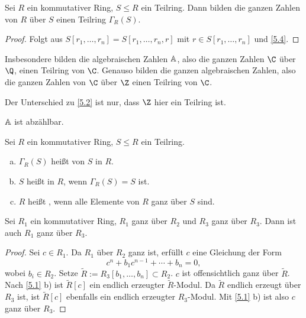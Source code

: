 \begin{kor} \label{5.5}
	Sei $R$ ein kommutativer Ring, $S \le R$ ein Teilring.
	Dann bilden die ganzen Zahlen von $R$ über $S$ einen Teilring $\Gamma_R(S)$.
	\begin{proof}
		Folgt aus $S[r_1, \dotsc, r_n] = S[r_1, \dotsc, r_n, r]$ mit $r \in S[r_1, \dotsc, r_n]$ und \ref{5.4}.
	\end{proof}
	\begin{note}
		Insbesondere bilden die algebraischen Zahlen $\mathbb{A}$, also die ganzen Zahlen $\C$ über $\Q$, einen Teilring von $\C$.
		Genauso bilden die ganzen algebraischen Zahlen, also die ganzen Zahlen von $\C$ über $\Z$ einen Teilring von $\C$.

		Der Unterschied zu \ref{5.2} ist nur, dass $\Z$ hier ein Teilring ist.

		$\mathbb{A}$ ist abzählbar.
	\end{note}
\end{kor}


\begin{df} \label{5.6}
	Sei $R$ ein kommutativer Ring, $S \le R$ ein Teilring.
	\begin{enumerate}[a)]
		\item
			$\Gamma_R(S)$ heißt  von $S$ in $R$.
		\item
			$S$ heißt  in $R$, wenn $\Gamma_R(S) = S$ ist.
		\item
			$R$ heißt , wenn alle Elemente von $R$ ganz über $S$ sind.
	\end{enumerate}
\end{df}

\begin{nt}
	Sei $R_1$ ein kommutativer Ring, $R_1$ ganz über $R_2$ und $R_3$ ganz über $R_3$.
	Dann ist auch $R_1$ ganz über $R_3$.
	\begin{proof}
		Sei $c \in R_1$.
		Da $R_1$ über $R_2$ ganz ist, erfüllt $c$ eine Gleichung der Form
		\[
			c^n + b_1 c^{n-1} + \dotsb + b_n = 0,
		\]
		wobei $b_i \in R_2$.
		Setze $\tilde R := R_3[b_1, \dotsc, b_n] \subset R_2$.
		$c$ ist offensichtlich ganz über $\tilde R$.
		Nach \ref{5.1} b) ist $\tilde R[c]$ ein endlich erzeugter $\tilde R$-Modul.
		Da $\tilde R$ endlich erzeugt über $R_3$ ist, ist $\tilde R[c]$ ebenfalls ein endlich erzeugter $R_3$-Modul.
		Mit \ref{5.1} b) ist also $c$ ganz über $R_3$.
	\end{proof}
\end{nt}

